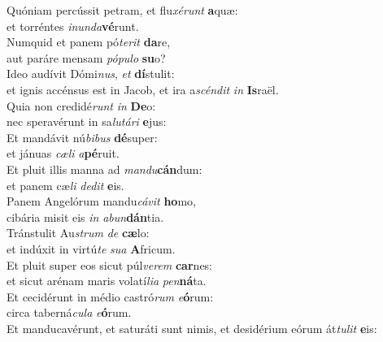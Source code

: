 \oddverse Quóniam percússit petram, et flu\textit{xé}\textit{runt} \textbf{a}quæ:~\*\\
\oddverse et torréntes \textit{i}\textit{nun}\textit{da}\textbf{vé}runt.\\
\evenverse Numquid et panem pó\textit{te}\textit{rit} \textbf{da}re,~\*\\
\evenverse aut paráre mensam \textit{pó}\textit{pu}\textit{lo} \textbf{su}o?\\
\oddverse Ideo audívit Dómi\textit{nus}, \textit{et} \textbf{dí}stulit:~\*\\
\oddverse et ignis accénsus est in Jacob, et ira a\textit{scén}\textit{dit} \textit{in} \textbf{Is}raël.\\
\evenverse Quia non credidé\textit{runt} \textit{in} \textbf{De}o:~\*\\
\evenverse nec speravérunt in sa\textit{lu}\textit{tá}\textit{ri} \textbf{e}jus:\\
\oddverse Et mandávit nú\textit{bi}\textit{bus} \textbf{dé}super:~\*\\
\oddverse et jánuas \textit{cæ}\textit{li} \textit{a}\textbf{pé}ruit.\\
\evenverse Et pluit illis manna ad \textit{man}\textit{du}\textbf{cán}dum:~\*\\
\evenverse et panem cæ\textit{li} \textit{de}\textit{dit} \textbf{e}is.\\
\oddverse Panem Angelórum mandu\textit{cá}\textit{vit} \textbf{ho}mo,~\*\\
\oddverse cibária misit eis \textit{in} \textit{a}\textit{bun}\textbf{dán}tia.\\
\evenverse Tránstulit Au\textit{strum} \textit{de} \textbf{cæ}lo:~\*\\
\evenverse et indúxit in virtú\textit{te} \textit{su}\textit{a} \textbf{A}fricum.\\
\oddverse Et pluit super eos sicut púl\textit{ve}\textit{rem} \textbf{car}nes:~\*\\
\oddverse et sicut arénam maris volatí\textit{li}\textit{a} \textit{pen}\textbf{ná}ta.\\
\evenverse Et cecidérunt in médio castró\textit{rum} \textit{e}\textbf{ó}rum:~\*\\
\evenverse circa taberná\textit{cu}\textit{la} \textit{e}\textbf{ó}rum.\\
\oddverse Et manducavérunt, et saturáti sunt nimis, et desidérium eórum át\textit{tu}\textit{lit} \textbf{e}is:~\*\\
